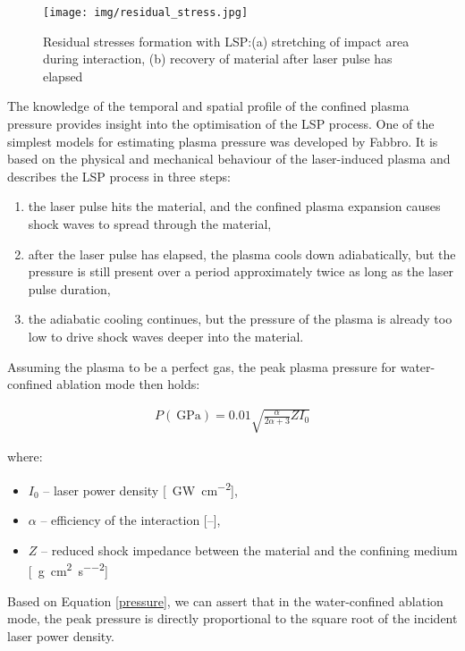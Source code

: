 \begin{figure}[h]
    \centering
    \texttt{[image: img/residual\_stress.jpg]}
    \caption{Residual stresses formation with LSP:(a) stretching of impact area during interaction, (b) recovery of material after laser pulse has elapsed \protect\cite{fabbro_peyre_berthe_scherpereel_1998}}
    \label{fig:lspresidual}
\end{figure}


The knowledge of the temporal and spatial profile of the confined plasma pressure provides insight into the optimisation of the LSP process. One of the simplest models for estimating plasma pressure was developed by Fabbro. It is based on the physical and mechanical behaviour of the laser-induced plasma and describes the LSP process in three steps:

\begin{enumerate}
    \item the laser pulse hits the material, and the confined plasma expansion causes shock waves to spread through the material,
    \item after the laser pulse has elapsed, the plasma cools down adiabatically, but the pressure is still present over a period approximately twice as long as the laser pulse duration,
    \item the adiabatic cooling continues, but the pressure of the plasma is already too low to drive shock waves deeper into the material.
\end{enumerate}

Assuming the plasma to be a perfect gas, the peak plasma pressure for water-confined ablation mode then holds:

\begin{gather} \label{pressure}
P(\SI{}{\giga\pascal}) = 0.01\sqrt{\frac{\alpha}{2\alpha + 3} Z I_{0} }
\end{gather} 

where:

\begin{itemize}
    \item $I_{0}$ -- laser power density [\SI{}{\giga\watt\per\cm\squared}],
    \item $\alpha$ -- efficiency of the interaction [--],
    \item $Z$ -- reduced shock impedance between the material and the confining medium [\SI{}{\gram\per\cm\squared\per\second\squared}]
\end{itemize}
    
Based on Equation \ref{pressure}, we can assert that in the water-confined ablation mode, the peak pressure is directly proportional to the square root of the incident laser power density.

